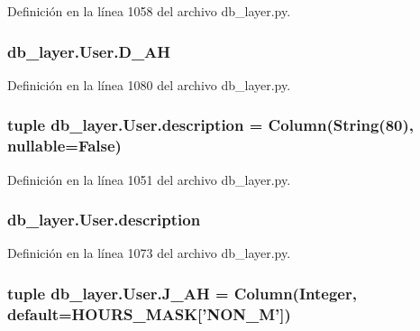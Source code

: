 Definición en la línea 1058 del archivo db\-\_\-layer.\-py.

\hypertarget{classdb__layer_1_1_user_a3c3567edc18b74fd8b72325dd92a7319}{
\subsubsection[{D\-\_\-\-A\-H}]{\setlength{\rightskip}{0pt plus 5cm}db\-\_\-layer.\-User.\-D\-\_\-\-A\-H}}\label{classdb__layer_1_1_user_a3c3567edc18b74fd8b72325dd92a7319}


Definición en la línea 1080 del archivo db\-\_\-layer.\-py.

\hypertarget{classdb__layer_1_1_user_af10568688235c01f6244aebc285192a7}{
\subsubsection[{description}]{\setlength{\rightskip}{0pt plus 5cm}tuple db\-\_\-layer.\-User.\-description = Column(String(80), nullable=False)\hspace{0.3cm}{\ttfamily [static]}}}\label{classdb__layer_1_1_user_af10568688235c01f6244aebc285192a7}


Definición en la línea 1051 del archivo db\-\_\-layer.\-py.

\hypertarget{classdb__layer_1_1_user_aa2c9cfe4abc9eaa4a24a03f8cb2fb0f0}{
\subsubsection[{description}]{\setlength{\rightskip}{0pt plus 5cm}db\-\_\-layer.\-User.\-description}}\label{classdb__layer_1_1_user_aa2c9cfe4abc9eaa4a24a03f8cb2fb0f0}


Definición en la línea 1073 del archivo db\-\_\-layer.\-py.

\hypertarget{classdb__layer_1_1_user_ad76a60aa40532d858fc7c47cc8ccfc6d}{
\subsubsection[{J\-\_\-\-A\-H}]{\setlength{\rightskip}{0pt plus 5cm}tuple db\-\_\-layer.\-User.\-J\-\_\-\-A\-H = Column(Integer, default={\bf H\-O\-U\-R\-S\-\_\-\-M\-A\-S\-K}\mbox{[}'N\-O\-N\-\_\-\-M'\mbox{]})\hspace{0.3cm}{\ttfamily [static]}}}\label{classdb__layer_1_1_user_ad76a60aa40532d858fc7c47cc8ccfc6d}


